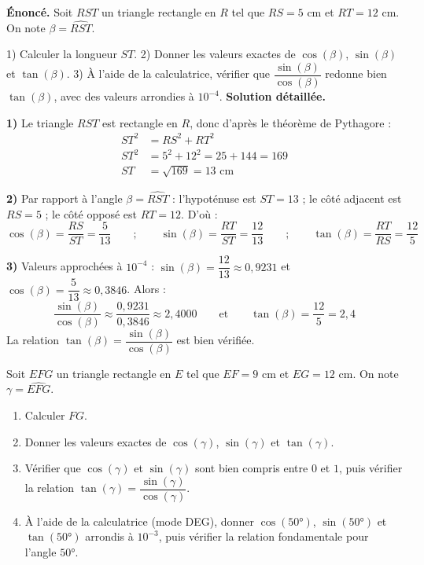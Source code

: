 \documentclass[11pt]{article}
\begin{document}
\begin{exoresolu}
\textbf{Énoncé.} Soit $RST$ un triangle rectangle en $R$ tel que $RS = 5$ cm et $RT = 12$ cm. On note $\beta = \widehat{RST}$.

1) Calculer la longueur $ST$.
2) Donner les valeurs exactes de $\cos(\beta)$, $\sin(\beta)$ et $\tan(\beta)$.
3) À l'aide de la calculatrice, vérifier que $\dfrac{\sin(\beta)}{\cos(\beta)}$ redonne bien $\tan(\beta)$, avec des valeurs arrondies à $10^{-4}$.
\tcblower
\textbf{Solution détaillée.}

\textbf{1)} Le triangle $RST$ est rectangle en $R$, donc d'après le théorème de Pythagore :
\begin{align*}
ST^2 &= RS^2 + RT^2 \\
ST^2 &= 5^2 + 12^2 = 25 + 144 = 169 \\
ST &= \sqrt{169} = 13 \text{ cm}
\end{align*}

\textbf{2)} Par rapport à l'angle $\beta = \widehat{RST}$ : l'hypoténuse est $ST = 13$ ; le côté adjacent est $RS = 5$ ; le côté opposé est $RT = 12$. D'où :
\[ \cos(\beta) = \dfrac{RS}{ST} = \dfrac{5}{13} \qquad ; \qquad \sin(\beta) = \dfrac{RT}{ST} = \dfrac{12}{13} \qquad ; \qquad \tan(\beta) = \dfrac{RT}{RS} = \dfrac{12}{5} \]

\textbf{3)} Valeurs approchées à $10^{-4}$ : $\sin(\beta) = \dfrac{12}{13} \approx 0,9231$ et $\cos(\beta) = \dfrac{5}{13} \approx 0,3846$. Alors :
\[ \dfrac{\sin(\beta)}{\cos(\beta)} \approx \dfrac{0,9231}{0,3846} \approx 2,4000 \qquad \text{et} \qquad \tan(\beta) = \dfrac{12}{5} = 2,4 \]
La relation $\tan(\beta) = \dfrac{\sin(\beta)}{\cos(\beta)}$ est bien vérifiée.
\end{exoresolu}

\begin{exercice}
Soit $EFG$ un triangle rectangle en $E$ tel que $EF = 9$ cm et $EG = 12$ cm. On note $\gamma = \widehat{EFG}$.
\begin{enumerate}
\item Calculer $FG$.
\item Donner les valeurs exactes de $\cos(\gamma)$, $\sin(\gamma)$ et $\tan(\gamma)$.
\item Vérifier que $\cos(\gamma)$ et $\sin(\gamma)$ sont bien compris entre $0$ et $1$, puis vérifier la relation $\tan(\gamma) = \dfrac{\sin(\gamma)}{\cos(\gamma)}$.
\item À l'aide de la calculatrice (mode DEG), donner $\cos(50°)$, $\sin(50°)$ et $\tan(50°)$ arrondis à $10^{-3}$, puis vérifier la relation fondamentale pour l'angle $50°$.
\end{enumerate}
\end{exercice}
\end{document}
